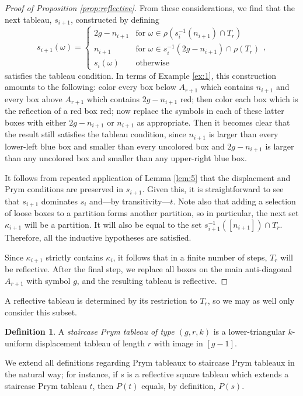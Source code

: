 \documentclass[11pt,reqno]{amsart}
\newcommand*{\inv}[1]{#1^{-1}}
\theoremstyle{definition}
\newtheorem{definition}{Definition}[section]
\theoremstyle{problem}
\theoremstyle{plain}
\theoremstyle{remark}
\theoremstyle{theorem}
\numberwithin{equation}{section}
\numberwithin{figure}{section}
\theoremstyle{definition}
\newtheorem{definition}{Definition}[section]
\theoremstyle{problem}
\theoremstyle{plain}
\begin{document}
\begin{proof}[Proof of Proposition \ref{prop:reflective}]
  From these considerations, we find that the next tableau, $s_{i+1}$,
  constructed by defining
  \begin{equation}
    \label{eq:10}
    s_{i+1}(\omega) = 
    \begin{cases}
      2g - n_{i+1} &
      \text{for } \omega \in \rho(\inv s_i(n_{i+1}) \cap T_r) \\
      n_{i+1} &
      \text{for } \omega \in \inv s_i(2g-n_{i+1}) \cap \rho(T_r) \\
      s_i(\omega) & \text{otherwise }
    \end{cases},
  \end{equation}
  satisfies the tableau condition.  In terms of Example \ref{ex:1}, this
  construction amounts to the following: color every box below
  $A_{r+1}$ which contains $n_{i+1}$ and every box above $A_{r+1}$
  which contains $2g - n_{i+1}$ red; then color each box which is the
  reflection of a red box red; now replace the symbols in each of
  these latter boxes with either $2g-n_{i+1}$ or $n_{i+1}$ as
  appropriate.  Then it becomes clear that the result still satisfies
  the tableau condition, since $n_{i+1}$ is larger than every lower-left
  blue box and smaller than every uncolored box and $2g-n_{i+1}$ is
  larger than any uncolored box and smaller than any upper-right blue
  box.

  It follows from repeated application of Lemma \ref{lem:5} that the
  displacment and Prym conditions are preserved in $s_{i+1}$.  Given
  this, it is straightforward to see that $s_{i+1}$ dominates $s_i$
  and---by transitivity---$t$.  Note also that adding a selection of
  loose boxes to a partition forms another partition, so in
  particular, the next set $\kappa_{i+1}$ will be a partition.  It
  will also be equal to the set $\inv s_{i+1} ([n_{i+1}]) \cap T_r$.
  Therefore, all the inductive hypotheses are satisfied.

  Since $\kappa_{i+1}$ strictly contains $\kappa_{i}$, it follows that
  in a finite number of steps, $T_r$ will be reflective.  After the
  final step, we replace all boxes on the main anti-diagonal $A_{r+1}$
  with symbol $g$, and the resulting tableau is reflective.
\end{proof}

A reflective tableau is determined by its restriction to
$T_r$, so we may as well only consider this subset. 

\begin{definition}
A \textit{staircase Prym tableau of type $(g,r,k)$} is
 a lower-triangular $k$-uniform displacement tableau of length $r$ with image
in $[g-1]$.  
\end{definition}
We extend all definitions regarding Prym tableaux to
staircase Prym tableaux in the natural way; for instance, if $s$ is a reflective square tableau which extends a
staircase Prym tableau $t$, then $P(t)$ equals, by definition, $P(s)$.
\end{document}
